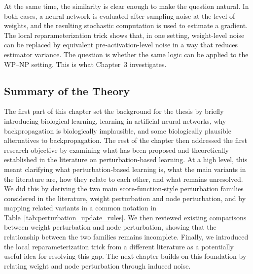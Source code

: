At the same time, the similarity is clear enough to make the question natural. In both cases, a neural network is evaluated after sampling noise at the level of weights, and the resulting stochastic computation is used to estimate a gradient. The local reparameterization trick shows that, in one setting, weight-level noise can be replaced by equivalent pre-activation-level noise in a way that reduces estimator variance. The question is whether the same logic can be applied to the WP--NP setting. This is what Chapter~3 investigates.

\subsection{Summary of the Theory}

The first part of this chapter set the background for the thesis by briefly introducing biological learning, learning in artificial neural networks, why backpropagation is biologically implausible, and some biologically plausible alternatives to backpropagation. The rest of the chapter then addressed the first research objective by examining what has been proposed and theoretically established in the literature on perturbation-based learning. At a high level, this meant clarifying what perturbation-based learning is, what the main variants in the literature are, how they relate to each other, and what remains unresolved. We did this by deriving the two main score-function-style perturbation families considered in the literature, weight perturbation and node perturbation, and by mapping related variants in a common notation in Table~\ref{tab:perturbation_update_rules}. We then reviewed existing comparisons between weight perturbation and node perturbation, showing that the relationship between the two families remains incomplete. Finally, we introduced the local reparameterization trick from a different literature as a potentially useful idea for resolving this gap. The next chapter builds on this foundation by relating weight and node perturbation through induced noise.
